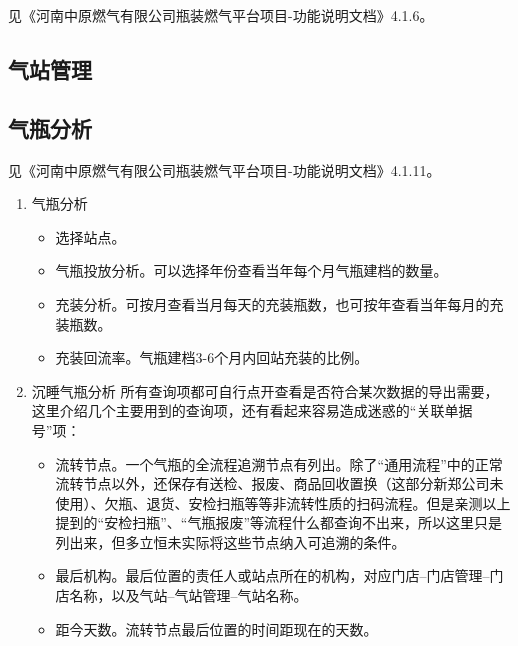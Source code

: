 \documentclass[UTF8]{ctexart}
\begin{document}
见《河南中原燃气有限公司瓶装燃气平台项目-功能说明文档》4.1.6。

\subsection{气站管理}



\subsection{气瓶分析}

见《河南中原燃气有限公司瓶装燃气平台项目-功能说明文档》4.1.11。

\begin{enumerate}
	\item 气瓶分析
	
	\begin{itemize}
		
		\item 选择站点。
		
		\item 气瓶投放分析。可以选择年份查看当年每个月气瓶建档的数量。
		
		\item 充装分析。可按月查看当月每天的充装瓶数，也可按年查看当年每月的充装瓶数。
		
		\item 充装回流率。气瓶建档3-6个月内回站充装的比例。
		
	\end{itemize}

	\item 沉睡气瓶分析
	所有查询项都可自行点开查看是否符合某次数据的导出需要，这里介绍几个主要用到的查询项，还有看起来容易造成迷惑的“关联单据号”项：
	\begin{itemize}
		
		\item 流转节点。一个气瓶的全流程追溯节点有列出。除了“通用流程”中的正常流转节点以外，还保存有送检、报废、商品回收置换（这部分新郑公司未使用）、欠瓶、退货、安检扫瓶等等非流转性质的扫码流程。但是亲测以上提到的“安检扫瓶”、“气瓶报废”等流程什么都查询不出来，所以这里只是列出来，但多立恒未实际将这些节点纳入可追溯的条件。
				
		\item 最后机构。最后位置的责任人或站点所在的机构，对应门店--门店管理--门店名称，以及气站--气站管理--气站名称。
		
		\item 距今天数。流转节点最后位置的时间距现在的天数。
		

\end{itemize}
\end{enumerate}
\end{document}
